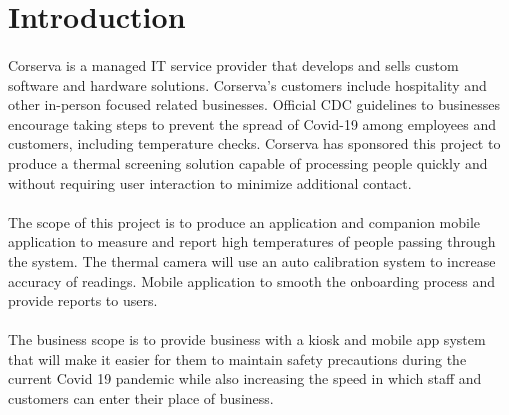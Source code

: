 \documentclass[12pt, letterpaper]{article}
\begin{document}
    
    \newpage
    \tableofcontents
    \newpage
    \listoftables
    \listoffigures
    \newpage
    \section{Introduction}
    \paragraph{}
    Corserva is a managed IT service provider that develops and sells custom software and 
    hardware solutions. Corserva's customers include hospitality and other in-person focused 
    related businesses. Official CDC guidelines to businesses encourage taking steps to prevent 
    the spread of Covid-19 among employees and customers, including temperature checks. Corserva 
    has sponsored this project to produce a thermal screening solution capable of processing 
    people quickly and without requiring user interaction to minimize additional contact.
    \paragraph{}
    The scope of this project is to produce an application and companion mobile application to 
    measure and report high temperatures of people passing through the system. The thermal 
    camera will use an auto calibration system to increase accuracy of readings. Mobile 
    application to smooth the onboarding process and provide reports to users.
    \paragraph{}
    The business scope is to provide business with a kiosk and mobile app
    system that will make it easier for them to maintain safety precautions during
    the current Covid 19 pandemic while also increasing the speed in which staff and customers 
    can enter their place of business.
\end{document}
